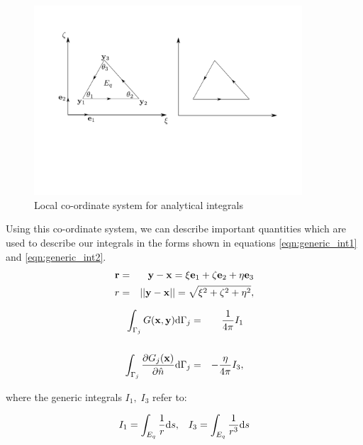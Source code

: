 \begin{figure}[hc]
\begin{centering}
	\includegraphics[width=10cm]{img/FataGeometry.pdf}
	\caption{Local co-ordinate system for analytical integrals}
	\label{fig:fata_local_coordinate}
\end{centering}
\end{figure}

Using this co-ordinate system, we can describe important quantities which are used to describe our integrals in the forms shown in equations \ref{eqn:generic_int1} and \ref{eqn:generic_int2}.
\begin{eqnarray*}
	\mathbf{r} & = & \mathbf{y}-\mathbf{x} = \xi\mathbf{e}_1 + \zeta\mathbf{e}_2 + \eta\mathbf{e}_3 \\ 
	r & = & ||\mathbf{y}-\mathbf{x}|| = \sqrt{\xi^{2} + \zeta^{2} + \eta^{2}},
\end{eqnarray*}
%

\begin{eqnarray}
	\int_{\Gamma_j} G(\vect{x},\vect{y}) \di{\Gamma_j} & = & \frac{1}{4\pi}I_1 \label{eqn:generic_int1}\\
	& & \nonumber \\
	\int_{\Gamma_j} \partiald{G_j(\vect{x})}{\nhat} \di{\Gamma_j} & = & -\frac{\eta}{4\pi}I_3, \label{eqn:generic_int2}
\end{eqnarray}

\noindent
where the generic integrals $I_1,\; I_3$ refer to:

\begin{equation}
	I_1 = \int_{E_q} \frac{1}{r} \text{d}s, \;\;\;I_3 = \int_{E_q} \frac{1}{r^{3}} \text{d}s
\end{equation}


